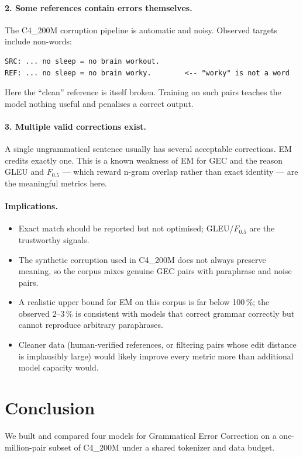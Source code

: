\documentclass[11pt,a4paper]{article}
\begin{document}
\paragraph{2. Some references contain errors themselves.}
The C4\_200M corruption pipeline is automatic and noisy. Observed targets
include non-words:
\begin{lstlisting}
SRC: ... no sleep = no brain workout.
REF: ... no sleep = no brain worky.        <-- "worky" is not a word
\end{lstlisting}
Here the ``clean'' reference is itself broken. Training on such pairs teaches
the model nothing useful and penalises a correct output.

\paragraph{3. Multiple valid corrections exist.}
A single ungrammatical sentence usually has several acceptable corrections.
EM credits exactly one. This is a known weakness of EM for GEC and the reason
GLEU and $F_{0.5}$ --- which reward n-gram overlap rather than exact identity ---
are the meaningful metrics here.

\paragraph{Implications.}
\begin{itemize}[noitemsep]
  \item Exact match should be reported but not optimised; GLEU/$F_{0.5}$ are the
        trustworthy signals.
  \item The synthetic corruption used in C4\_200M does not always preserve
        meaning, so the corpus mixes genuine GEC pairs with paraphrase and
        noise pairs.
  \item A realistic upper bound for EM on this corpus is far below 100\,\%; the
        observed 2--3\,\% is consistent with models that correct grammar
        correctly but cannot reproduce arbitrary paraphrases.
  \item Cleaner data (human-verified references, or filtering pairs whose edit
        distance is implausibly large) would likely improve every metric more
        than additional model capacity would.
\end{itemize}

\section{Conclusion}
We built and compared four models for Grammatical Error Correction on a
one-million-pair subset of C4\_200M under a shared tokenizer and data budget.
\end{document}
